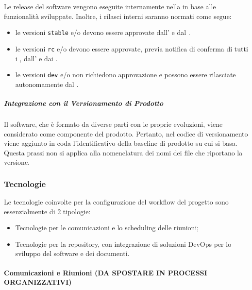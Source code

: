 		Le release del software vengono eseguite internamente nella  in base alle funzionalità sviluppate. Inoltre, i rilasci interni saranno normati come segue:
		\begin{itemize}
			\item le versioni \verb!stable! e/o  devono essere approvate dall' e dal .
			\item le versioni \verb!rc! e/o  devono essere approvate, previa notifica di conferma di tutti i , dall' e dai .
			\item le versioni \verb!dev! e/o  non richiedono approvazione e possono essere rilasciate autonomamente dal .
		\end{itemize}

		\subparagraph{Integrazione con il Versionamento di Prodotto}

		Il software, che è formato da diverse parti con le proprie evoluzioni, viene considerato come componente del prodotto. Pertanto, nel codice di versionamento viene aggiunto in coda l'identificativo della baseline di prodotto su cui si basa. Questa prassi non si applica alla nomenclatura dei nomi dei file che riportano la versione.

\subsubsection{Tecnologie}

Le tecnologie coinvolte per la configurazione del workflow del progetto sono essenzialmente di 2 tipologie:
\begin{itemize}
	\item Tecnologie per le comunicazioni e lo scheduling delle riunioni;
	\item Tecnologie per la repository, con integrazione di soluzioni DevOps per lo sviluppo del software e dei documenti.
\end{itemize}

	\paragraph{Comunicazioni e Riunioni (DA SPOSTARE IN PROCESSI ORGANIZZATIVI)}

